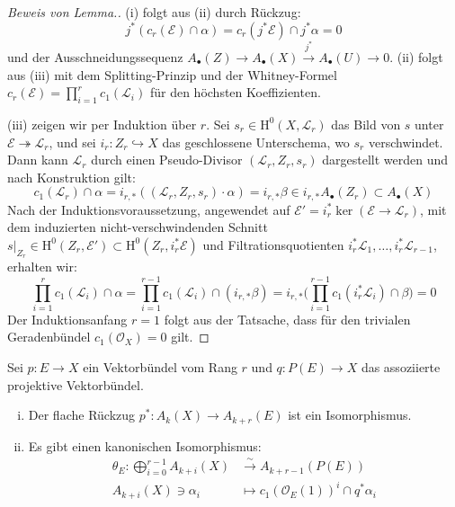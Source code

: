 \documentclass[10pt,b5paper]{article}
\begin{document}
\begin{proof}[Beweis von Lemma.]
(i) folgt aus (ii) durch Rückzug:
\[ j^\ast(c_r(\mathcal{E})\cap\alpha) = c_r(j^\ast\mathcal{E})\cap j^\ast\alpha = 0 \]
und der Ausschneidungssequenz $A_\bullet(Z)\to A_\bullet(X) \stackrel{j^\ast}{\to} A_\bullet(U)\to 0$. (ii) folgt aus (iii) mit dem Splitting-Prinzip und der Whitney-Formel $c_r(\mathcal{E}) = \prod_{i=1}^rc_1(\mathcal{L}_i)$ für den höchsten Koeffizienten.

(iii) zeigen wir per Induktion über $r$. Sei $s_r\in\mathrm{H}^0(X, \mathcal{L}_r)$ das Bild von $s$ unter $\mathcal{E}\twoheadrightarrow\mathcal{L}_r$, und sei $i_r: Z_r\hookrightarrow X$ das geschlossene Unterschema, wo $s_r$ verschwindet. Dann kann $\mathcal{L}_r$ durch einen Pseudo-Divisor $(\mathcal{L}_r,Z_r,s_r)$ dargestellt werden und nach Konstruktion gilt:
\[ c_1(\mathcal{L}_r)\cap \alpha = i_{r,\ast}((\mathcal{L}_r, Z_r, s_r)\cdot\alpha) = i_{r,\ast}\beta \in i_{r,\ast}A_\bullet(Z_r)\subset A_\bullet(X) \]
Nach der Induktionsvoraussetzung, angewendet auf $\mathcal{E}' = i_r^\ast \ker(\mathcal{E}\to\mathcal{L}_r)$, mit dem induzierten nicht-verschwindenden Schnitt $s|_{Z_r}\in\mathrm{H}^0(Z_r,\mathcal{E}')\subset \mathrm{H}^0(Z_r, i_r^\ast\mathcal{E})$ und Filtrationsquotienten $i^\ast_r\mathcal{L}_1,\ldots,i_r^\ast\mathcal{L}_{r-1}$, erhalten wir:
\[ \prod_{i=1}^rc_1(\mathcal{L}_i)\cap\alpha = \prod_{i=1}^{r-1} c_1(\mathcal{L}_i)\cap (i_{r,\ast}\beta) = i_{r,\ast}\Big(\prod_{i=1}^{r-1} c_1(i_r^\ast\mathcal{L}_i)\cap\beta\Big) = 0 \]
Der Induktionsanfang $r=1$ folgt aus der Tatsache, dass für den trivialen Geradenbündel $c_1(\mathcal{O}_X) = 0$ gilt.
\end{proof}

\begin{theorem}
Sei $p:E\to X$ ein Vektorbündel vom Rang $r$ und $q:P(E)\to X$ das assoziierte projektive Vektorbündel.
\begin{enumerate}[(i)]
\item Der flache Rückzug $p^\ast: A_k(X)\to A_{k+r}(E)$ ist ein Isomorphismus.
\item Es gibt einen kanonischen Isomorphismus:
\begin{align*}
\theta_E: \bigoplus_{i=0}^{r-1}A_{k +i}(X) &\stackrel{\sim}{\longrightarrow} A_{k +r-1}(P(E))\\
A_{k+i}(X)\ni \alpha_i &\longmapsto c_1(\mathcal{O}_E(1))^i\cap q^\ast\alpha_i
\end{align*}
\end{enumerate}
\end{theorem}
\end{document}
